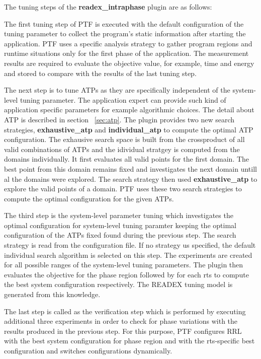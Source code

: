 The tuning steps of the \textbf{readex\_intraphase} plugin are as follows:

The first tuning step of PTF is executed with the default configuration of the tuning parameter to collect the program's static information after starting the application. PTF uses a specific analysis strategy to gather program regions and runtime situations only for the first phase of the application. The measurement results are required to evaluate the objective value, for example, time and energy and stored to compare with the results of the last tuning step.

The next step is to tune ATPs as they are specifically independent of the system-level tuning parameter. The application expert can provide such kind of application specific parameters for example algorithmic choices. The detail about ATP is described in section ~\ref{sec:atp}. The plugin provides two new search strategies, \textbf{exhaustive\_atp} and \textbf{individual\_atp} to compute the optimal ATP configuration. The exhausive search space is built from the crossproduct of all valid combinations of ATPs and the idividual stratgey is computed from the domains individually. It first evaluates all valid points for the first domain. The best point from this domain remains fixed and investigates the next domain untill al the domains were explored. The search strategy then used \textbf{exhaustive\_atp} to explore the valid points of a domain. PTF uses these two search strategies to compute the optimal configuration for the given ATPs.   

The third step is the system-level parameter tuning which investigates the optimal configuration for system-level tuning paramter keeping the optimal configuration of the ATPs fixed found during the previous step. The search strategy is read from the configuration file. If no strategy us specified, the default individual search algorithm is selected on this step. The experiments are created for all possible ranges of the system-level tuning parameters. The plugin then evaluates the objective for the phase region followed by for each rts to compute the best system configuration respectively. The READEX tuning model is generated from this knowledge. 

The last step is called as the verification step which is performed by executing additional three experiments in order to check for phase variations with the results produced in the previous step. For this purpose, PTF configures RRL with the best system configuration for phase region and with the rts-specific best configuration and switches configurations dynamically.
 
